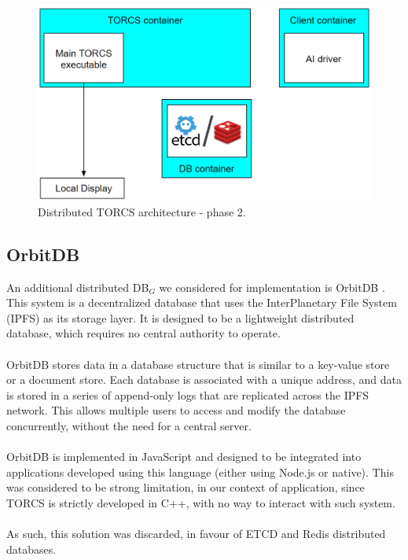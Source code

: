 \begin{figure}[h!]
	\centering
	\includegraphics[width=0.8\linewidth]{"immagini/Software development/Development-2"}
	\caption[Distributed TORCS architecture - phase 2.]{Distributed TORCS architecture - phase 2.}
	\label{fig:development-2}
\end{figure}

\subsection{OrbitDB}
An additional distributed DB$_G$ we considered for implementation is OrbitDB \cite{site:orbitdb}. This system is a decentralized database that uses the InterPlanetary File System (IPFS) as its storage layer. It is designed to be a lightweight distributed database, which requires no central authority to operate. \\ \\
OrbitDB stores data in a database structure that is similar to a key-value store or a document store. Each database is associated with a unique address, and data is stored in a series of append-only logs that are replicated across the IPFS network. This allows multiple users to access and modify the database concurrently, without the need for a central server. \\ \\
OrbitDB is implemented in JavaScript and designed to be integrated into applications developed using this language (either using Node.js or native). This was considered to be strong limitation, in our context of application, since TORCS is strictly developed in C++, with no way to interact with such system. \\ \\
As such, this solution was discarded, in favour of ETCD and Redis distributed databases.

